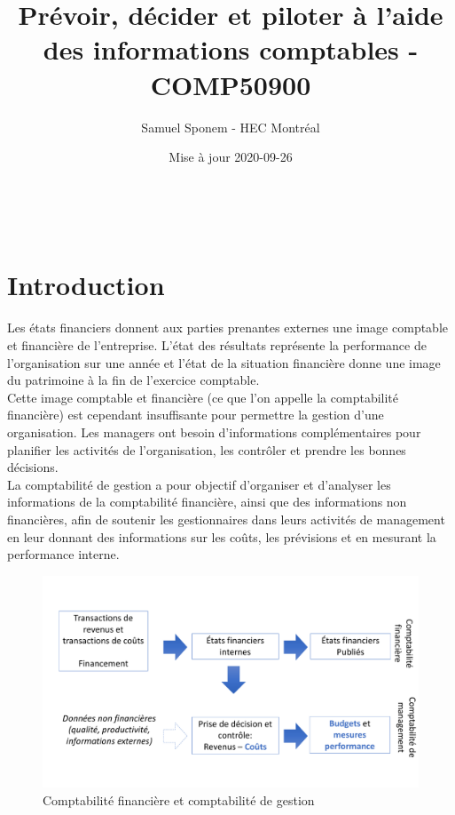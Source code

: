 \documentclass{tufte-handout}
\author{Samuel Sponem - HEC Montréal}
\date{Mise à jour 2020-09-26}
\title{Prévoir, décider et piloter à l'aide des informations comptables - COMP50900}
\begin{document}
\maketitle
\tableofcontents

\clearpage\\
\section{Introduction}
\label{sec:org478d0ab}
Les états financiers donnent aux parties prenantes externes une image comptable et financière de l'entreprise. L'état des résultats représente la performance de l'organisation sur une année et l'état de la situation financière donne une image du patrimoine à la fin de l'exercice comptable.\\

Cette image comptable et financière (ce que l'on appelle la comptabilité financière) est cependant insuffisante pour permettre la gestion d'une organisation. Les managers ont besoin d'informations complémentaires pour planifier les activités de l'organisation, les contrôler et prendre les bonnes décisions.\\

La comptabilité de gestion a pour objectif d'organiser et d'analyser les informations de la comptabilité financière, ainsi que des informations non financières, afin de soutenir les gestionnaires dans leurs activités de management en leur donnant des informations sur les coûts, les prévisions et en mesurant la performance interne.\\

\begin{figure}[htbp]
\centering
\includegraphics[width=.9\linewidth]{./img/comptafi.pdf}
\caption{\label{fig:org772e6cf}Comptabilité financière et comptabilité de gestion}
\end{figure}
\end{document}
